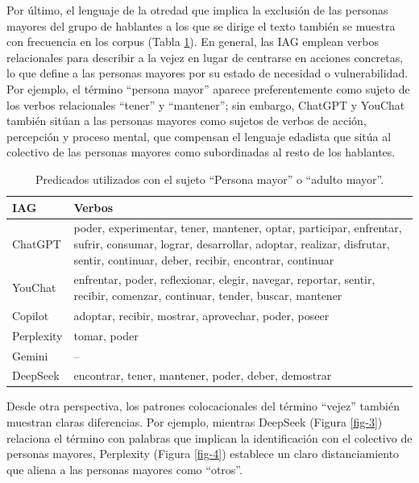 \documentclass[spanish]{textolivre}
\begin{document}
Por último, el lenguaje de la otredad que implica la exclusión de las personas mayores del grupo de hablantes a los que se dirige el texto también se muestra con frecuencia en los corpus (Tabla \ref{tab-8}). En general, las IAG emplean verbos relacionales para describir a la vejez en lugar de centrarse en acciones concretas, lo que define a las personas mayores por su estado de necesidad o vulnerabilidad. Por ejemplo, el término ``persona mayor'' aparece preferentemente como sujeto de los verbos relacionales ``tener'' y ``mantener''; sin embargo, ChatGPT y YouChat también sitúan a las personas mayores como sujetos de verbos de acción, percepción y proceso mental, que compensan el lenguaje edadista que sitúa al colectivo de las personas mayores como subordinadas al resto de los hablantes.

\begin{table}[h!]
\centering
\begin{threeparttable}
\caption{Predicados utilizados con el sujeto ``Persona mayor'' o ``adulto mayor''.}\label{tab-8}
\begin{tabular}{lp{10cm}}
\toprule
IAG & Verbos \\
\midrule
ChatGPT & poder, experimentar, tener, mantener, optar, participar, enfrentar, sufrir, consumar, lograr, desarrollar, adoptar, realizar, disfrutar, sentir, continuar, deber, recibir, encontrar, continuar \\
YouChat & enfrentar, poder, reflexionar, elegir, navegar, reportar, sentir, recibir, comenzar, continuar, tender, buscar, mantener \\
Copilot & adoptar, recibir, mostrar, aprovechar, poder, poseer \\
Perplexity & tomar, poder \\
Gemini & -- \\
DeepSeek & encontrar, tener, mantener, poder, deber, demostrar \\
\bottomrule
\end{tabular}
\end{threeparttable}
\end{table}

Desde otra perspectiva, los patrones colocacionales del término ``vejez'' también muestran claras diferencias. Por ejemplo, mientras DeepSeek (Figura \ref{fig-3}) relaciona el término con palabras que implican la identificación con el colectivo de personas mayores, Perplexity (Figura \ref{fig-4}) establece un claro distanciamiento que aliena a las personas mayores como ``otros''.
\end{document}
